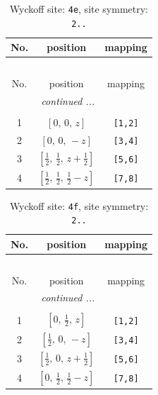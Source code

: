 \documentclass[fleqn,8pt]{jsarticle}
\begin{document}
\begin{longtable}{ccc}
\caption{Wyckoff site: {\tt 4e}, site symmetry: {\tt 2..}}
 \\
 \hline \hline
No. & position & mapping \\ \hline \endfirsthead

\multicolumn{2}{l}{\tablename\ \thetable{}} \\
 \hline \hline
No. & position & mapping \\ \hline \endhead

 \hline \hline
\multicolumn{2}{r}{\footnotesize\it continued ...} \\ \endfoot

 \hline \hline
\multicolumn{2}{r}{} \\ \endlastfoot

1 & $\left[ 0,\, 0,\, z \right]$ & {\tt [1,2]} \\ \hline
2 & $\left[ 0,\, 0,\, - z \right]$ & {\tt [3,4]} \\ \hline
3 & $\left[ \frac{1}{2},\, \frac{1}{2},\, z + \frac{1}{2} \right]$ & {\tt [5,6]} \\ \hline
4 & $\left[ \frac{1}{2},\, \frac{1}{2},\, \frac{1}{2} - z \right]$ & {\tt [7,8]} \\
\end{longtable}
\renewcommand{\arraystretch}{1.2}
\begin{longtable}{ccc}
\caption{Wyckoff site: {\tt 4f}, site symmetry: {\tt 2..}}
 \\
 \hline \hline
No. & position & mapping \\ \hline \endfirsthead

\multicolumn{2}{l}{\tablename\ \thetable{}} \\
 \hline \hline
No. & position & mapping \\ \hline \endhead

 \hline \hline
\multicolumn{2}{r}{\footnotesize\it continued ...} \\ \endfoot

 \hline \hline
\multicolumn{2}{r}{} \\ \endlastfoot

1 & $\left[ 0,\, \frac{1}{2},\, z \right]$ & {\tt [1,2]} \\ \hline
2 & $\left[ \frac{1}{2},\, 0,\, - z \right]$ & {\tt [3,4]} \\ \hline
3 & $\left[ \frac{1}{2},\, 0,\, z + \frac{1}{2} \right]$ & {\tt [5,6]} \\ \hline
4 & $\left[ 0,\, \frac{1}{2},\, \frac{1}{2} - z \right]$ & {\tt [7,8]} \\
\end{longtable}
\end{document}
